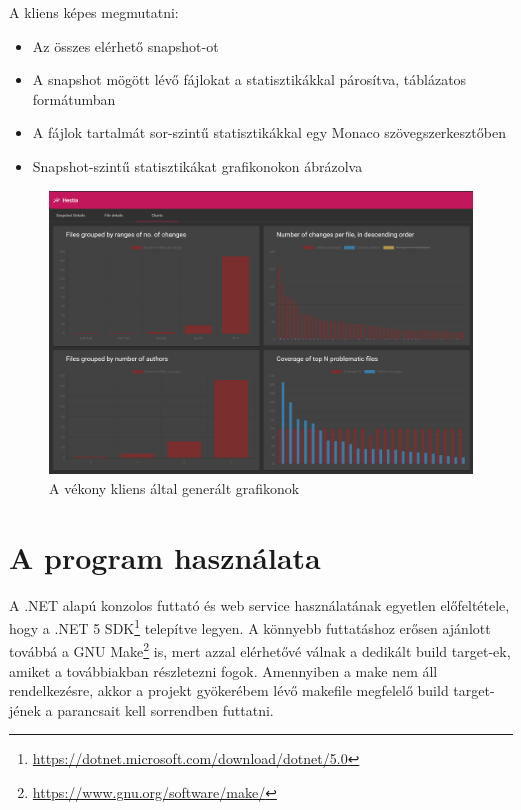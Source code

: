 A kliens képes megmutatni:
\begin{itemize}
    \item Az összes elérhető snapshot-ot
    \item A snapshot mögött lévő fájlokat a statisztikákkal párosítva, táblázatos formátumban
    \item A fájlok tartalmát sor-szintű statisztikákkal egy Monaco szövegszerkesztőben
    \item Snapshot-szintű statisztikákat grafikonokon ábrázolva
\end{itemize}

\begin{figure}[H]
    \centering
    \includegraphics[width=1\textwidth]{images/hestia_charts.png}
    \caption{A vékony kliens által generált grafikonok}
    \label{fig:hestia-charts}
\end{figure}

\section{A program használata}

A .NET alapú konzolos futtató és web service használatának egyetlen előfeltétele, hogy a .NET 5 SDK\footnote{\url{https://dotnet.microsoft.com/download/dotnet/5.0}} telepítve legyen. A könnyebb futtatáshoz erősen ajánlott továbbá a GNU Make\footnote{\url{https://www.gnu.org/software/make/}} is, mert azzal elérhetővé válnak a dedikált build target-ek, amiket a továbbiakban részletezni fogok. Amennyiben a make nem áll rendelkezésre, akkor a projekt gyökerébem lévő makefile megfelelő build target-jének a parancsait kell sorrendben futtatni.

